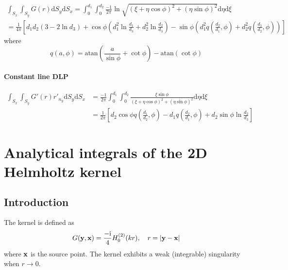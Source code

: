 \documentclass[a4paper,11pt]{article}
\newcommand{\td}{\mathrm{d}}
\newcommand{\ti}{\mathrm{i}}
\newcommand{\atan}{\mathrm{atan}}
\begin{document}
\begin{multline}
\int_{S_{x}} \int_{S_{y}} G(r) \td S_y \td S_x =
\int_{0}^{d_1} \int_{0}^{d_2}
\frac{-1}{2\pi}\ln \sqrt{(\xi+\eta \cos\phi)^2 + (\eta\sin\phi)^2}
\td \eta \td \xi \\
=
\frac{1}{4 \pi}
\left[
d_1 d_2 \left(3 - 2 \ln d_3 \right)
+ \cos\phi \left(d_1^2 \ln \frac{d_1}{d_3} + d_2^2 \ln \frac{d_2}{d_3}\right)
- \sin\phi \left(d_1^2 q\left(\frac{d_2}{d_1}, \phi\right) + d_2^2 q\left(\frac{d_1}{d_2}, \phi\right)\right)
\right]
\end{multline}
%
where
%
\begin{equation}
q(a, \phi) = \atan\left(\frac{a}{\sin\phi} + \cot\phi\right) - \atan\left(\cot\phi\right)
\end{equation}

\paragraph{Constant line DLP}

\begin{align}
\int_{S_{x}} \int_{S_{y}} G'(r) r'_{n_{y}} \td S_y \td S_x
&=
\frac{-1}{2\pi}\int_{0}^{d_1} \int_{0}^{d_2}
\frac{\xi\sin\phi}{(\xi+\eta \cos\phi)^2 + (\eta\sin\phi)^2}
\td \eta \td \xi \nonumber \\
&=
\frac{1}{2\pi}\left[
	d_2 \cos\phi q\left(\frac{d_1}{d_2}, \phi\right)
	- d_1 q\left(\frac{d_2}{d_1}, \phi\right)
	+ d_2 \sin\phi \ln \frac{d_2}{d_3}
\right]
\end{align}



\section {Analytical integrals of the 2D Helmholtz kernel}

\subsection{Introduction}

The kernel is defined as
%
\begin{equation}
	G({\bf y}, {\bf x}) = \frac{-\ti}{4} H_0^{(2)}(kr), \quad r = |{\bf y} - {\bf x}|
\end{equation}
%
where ${\bf x}$ is the source point. The kernel exhibits a weak (integrable) singularity when $r \to 0$.
\end{document}
